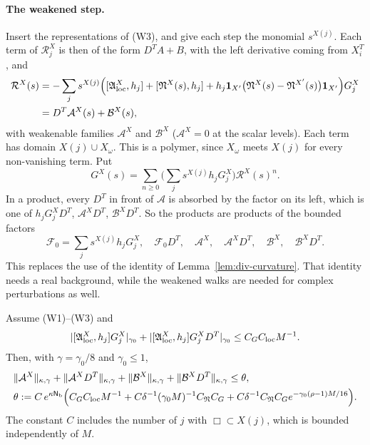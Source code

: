 \paragraph{The weakened step.} Insert the representations of (W3), and give each step the monomial $s^{X(j)}$. Each term of $\mathcal R^X_j$ is then of the form $D^TA+B$, with the left derivative coming from $X_i^T$, and
\[
\begin{aligned}
\mathcal R^X(s)&=-\sum_js^{X(j)}\Big([\mathfrak A^X_{\rm loc},h_j]+[\mathfrak N^X(s),h_j]+h_j\mathbf 1_{X'}\big(\mathfrak N^X(s)-\mathfrak N^{X'}(s)\big)\mathbf 1_{X'}\Big)G^X_j\\
&=D^T\mathcal A^X(s)+\mathcal B^X(s),
\end{aligned}
\]
with weakenable families $\mathcal A^X$ and $\mathcal B^X$ ($\mathcal A^X=0$ at the scalar levels). Each term has domain $X(j)\cup X_\omega$. This is a polymer, since $X_\omega$ meets $X(j)$ for every non-vanishing term. Put
\[
G^X(s)=\sum_{n\ge0}\Big(\sum_js^{X(j)}h_jG^X_j\Big)\mathcal R^X(s)^n .
\]
In a product, every $D^T$ in front of $\mathcal A$ is absorbed by the factor on its left, which is one of $h_jG^X_jD^T$, $\mathcal A^XD^T$, $\mathcal B^XD^T$. So the products are products of the bounded factors
\[
\mathcal F_0=\sum_js^{X(j)}h_jG^X_j,\quad\mathcal F_0D^T,\quad\mathcal A^X,\quad\mathcal A^XD^T,\quad\mathcal B^X,\quad\mathcal B^XD^T .
\]
This replaces the use of the identity of Lemma~\ref{lem:div-curvature}. That identity needs a real background, while the weakened walks are needed for complex perturbations as well.

\begin{lemma}\label{lem:step-small}
Assume (W1)--(W3) and
\[
|[\mathfrak A^X_{\rm loc},h_j]G^X_j|_{\gamma_0}+|[\mathfrak A^X_{\rm loc},h_j]G^X_jD^T|_{\gamma_0}\le C_GC_{\rm loc}M^{-1}.
\]
Then, with $\gamma=\gamma_0/8$ and $\gamma_0\le1$,
\[
\begin{aligned}
&\|\mathcal A^X\|_{\kappa,\gamma}+\|\mathcal A^XD^T\|_{\kappa,\gamma}+\|\mathcal B^X\|_{\kappa,\gamma}+\|\mathcal B^XD^T\|_{\kappa,\gamma}\le\theta,\\
&\theta:=C\,e^{\kappa\mathsf N_{\rm b}}\Big(C_GC_{\rm loc}M^{-1}+C\delta^{-1}(\gamma_0M)^{-1}C_{\mathfrak N}C_G+C\delta^{-1}C_{\mathfrak N}C_Ge^{-\gamma_0(\rho-1)M/16}\Big).
\end{aligned}
\]
The constant $C$ includes the number of $j$ with $\Box\subset X(j)$, which is bounded independently of $M$.
\end{lemma}

